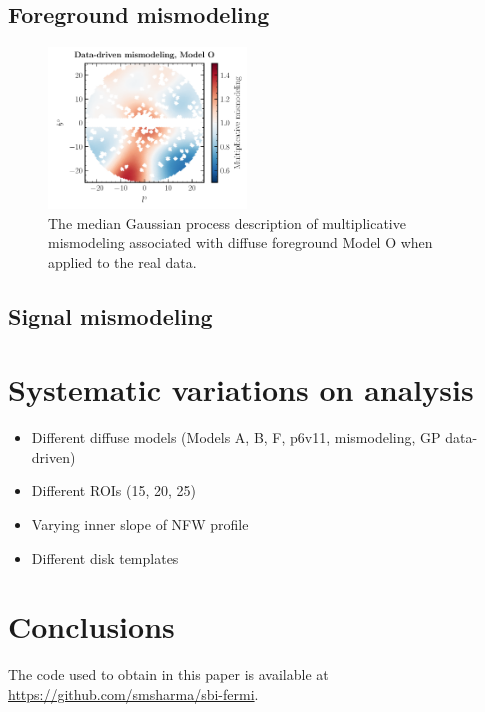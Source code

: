 \documentclass[prd,aps,10pt,nofootinbib,twocolumn,superscriptaddress,preprintnumbers,balancelastpage,longbibliography]{revtex4-1}
\begin{document}
\subsection{Foreground mismodeling}
\label{sec:fg-mismodeling}

%
\begin{figure}
    \centering
    \includegraphics[width=0.47\textwidth]{plots/dd_mismo_map.pdf}
    \caption{The median Gaussian process description of multiplicative mismodeling associated with diffuse foreground Model O when applied to the real \Fermi data.}
    \label{fig:dd_mismo_map}
\end{figure}
%


\subsection{Signal mismodeling}
\label{sec:sig-mismodeling}

\section{Systematic variations on analysis}
\label{sec:systematics}

\begin{itemize}
    \item Different diffuse models (Models A, B, F, p6v11, mismodeling, GP data-driven)
    \item Different ROIs (15, 20, 25)
    \item Varying inner slope of NFW profile
    \item Different disk templates
\end{itemize}

\section{Conclusions}
\label{sec:conclusion}

The code used to obtain in this paper is available at \url{https://github.com/smsharma/sbi-fermi}.
\end{document}
